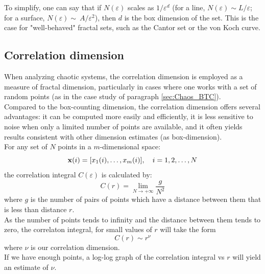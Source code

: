 To simplify, one can say that if $N(\varepsilon)$ scales as $1/\varepsilon^d$ (for a line, $N(\varepsilon) \sim L/\varepsilon$; for a surface, $N(\varepsilon) \sim~A/\varepsilon^2$), then $d$ is the box dimension of the set. This is the case for "well-behaved" fractal sets, such as the Cantor set or the von Koch curve.


\subsection{Correlation dimension} \label{app:C_Correlation_dimension}
When analyzing chaotic systems, the correlation dimension is employed as a measure of fractal dimension, particularly in cases where one works with a set of random points (as in the case study of paragraph \ref{sec:Chaos_BTC}).\\

Compared to the box-counting dimension, the correlation dimension offers several advantages: it can be computed more easily and efficiently, it is less sensitive to noise when only a limited number of points are available, and it often yields results consistent with other dimension estimates (as box-dimension).\\

For any set of $N$ points in a $m$-dimensional space:
\begin{equation*}
    \vb{x}(i)=[x_1(i),\dots,x_m(i)], \quad i=1,2,\dots,N
\end{equation*}
the correlation integral $C(\varepsilon)$ is calculated by:
\begin{equation*}
    C(r)=\lim_{N \to +\infty} \frac{g}{N^2}
\end{equation*}
where $g$ is the number of pairs of points which have a distance between them that is less than distance $r$.\\
As the number of points tends to infinity and the distance between them tends to zero, the correlaton integral, for small values of $r$ will take the form 
\begin{equation*}
    C(r) \sim r^\nu
\end{equation*}
where $\nu$ is our correlation dimension.\\
If we have enough points, a log-log graph of the correlation integral vs $r$ will yield an estimate of $\nu$.